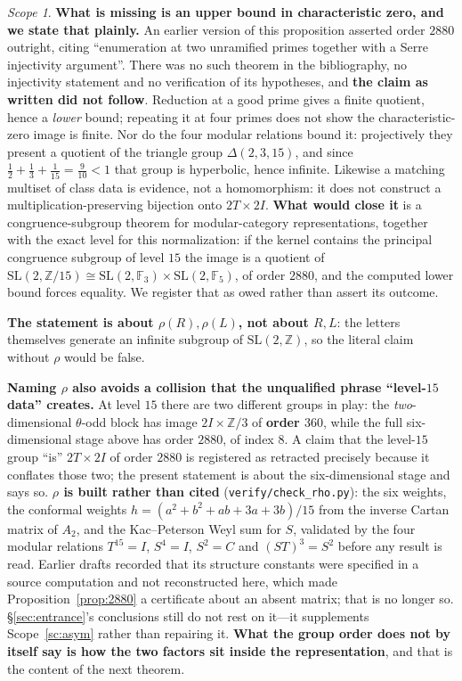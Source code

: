 \documentclass[11pt,reqno]{amsart}
\theoremstyle{plain}
\theoremstyle{definition}
\theoremstyle{remark}
\newtheorem{scope}[theorem]{Scope}
\newcommand{\Z}{\mathbb{Z}}
\newcommand{\F}{\mathbb{F}}
\newcommand{\SL}{\mathrm{SL}}
\newcommand{\fn}[1]{\texttt{\small #1}}
\begin{document}
\begin{scope}\label{sc:2880}
\textbf{What is missing is an upper bound in characteristic zero, and we state that
plainly.} An earlier version of this proposition asserted order $2880$ outright, citing
``enumeration at two unramified primes together with a Serre injectivity argument''. There
was no such theorem in the bibliography, no injectivity statement and no verification of
its hypotheses, and \textbf{the claim as written did not follow}. Reduction at a good prime
gives a finite quotient, hence a \emph{lower} bound; repeating it at four primes does not
show the characteristic-zero image is finite. Nor do the four modular relations bound it:
projectively they present a quotient of the triangle group $\Delta(2,3,15)$, and since
$\tfrac12+\tfrac13+\tfrac1{15}=\tfrac9{10}<1$ that group is hyperbolic, hence infinite.
Likewise a matching multiset of class data is evidence, not a homomorphism: it does not
construct a multiplication-preserving bijection onto $2T\times2I$. \textbf{What would close
it} is a congruence-subgroup theorem for modular-category representations, together with
the exact level for this normalization: if the kernel contains the principal congruence
subgroup of level $15$ the image is a quotient of
$\SL(2,\Z/15)\cong\SL(2,\F_3)\times\SL(2,\F_5)$, of order $2880$, and the computed lower
bound forces equality. We register that as owed rather than assert its outcome.

\textbf{The statement is about $\rho(R),\rho(L)$, not about $R,L$}: the letters
themselves generate an infinite subgroup of $\SL(2,\Z)$, so the literal claim without
$\rho$ would be false.

\textbf{Naming $\rho$ also avoids a collision that the unqualified phrase ``level-$15$
data'' creates.} At level $15$ there are two different groups in play: the
\emph{two}-dimensional $\theta$-odd block has image $2I\times\Z/3$ of \textbf{order
$360$}, while the full six-dimensional stage above has order $2880$, of index $8$. A
claim that the level-$15$ group ``is'' $2T\times2I$ of order $2880$ is registered as
retracted precisely because it conflates those two; the present statement is about the
six-dimensional stage and says so. \textbf{$\rho$ is built rather than cited}
(\fn{verify/check\_\allowbreak rho.py}): the six weights, the conformal weights
$h=(a^2{+}b^2{+}ab{+}3a{+}3b)/15$ from the inverse Cartan matrix of $A_2$, and the
Kac--Peterson Weyl sum for $S$, validated by the four modular relations $T^{15}=I$,
$S^4=I$, $S^2=C$ and $(ST)^3=S^2$ before any result is read. Earlier drafts recorded that
its structure constants were specified in a source computation and not reconstructed here,
which made Proposition~\ref{prop:2880} a certificate about an absent matrix; that is no
longer so. \S\ref{sec:entrance}'s conclusions still do not rest on it---it supplements
Scope~\ref{sc:asym} rather than repairing it. \textbf{What the group order
does not by itself say is how the two factors sit inside the representation}, and that is
the content of the next theorem.
\end{scope}
\end{document}
